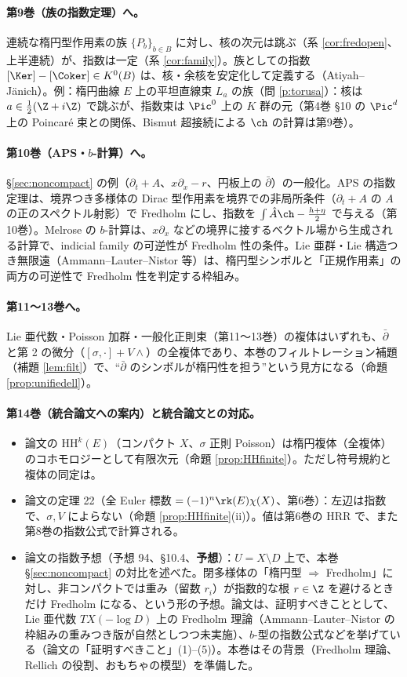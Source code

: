 \paragraph{第9巻（族の指数定理）へ。}連続な楕円型作用素の族 $\{P_b\}_{b\in B}$ に対し、核の次元は跳ぶ（系 \ref{cor:fredopen}、上半連続）が、指数は一定（系 \ref{cor:family}）。族としての指数 $[\Ker]-[\Coker]\in K^0(B)$ は、核・余核を安定化して定義する（Atiyah--Jänich）。例：楕円曲線 $E$ 上の平坦直線束 $L_a$ の族（問 \ref{p:torusa}）：核は $a\in\frac12(\Z+i\Z)$ で跳ぶが、指数束は $\Pic^0$ 上の $K$ 群の元（第4巻 \S10 の $\Pic^d$ 上の Poincaré 束との関係、Bismut 超接続による $\ch$ の計算は第9巻）。
\paragraph{第10巻（APS・$b$-計算）へ。}\S\ref{sec:noncompact} の例（$\partial_t+A$、$x\partial_x-r$、円板上の $\bar\partial$）の一般化。APS の指数定理は、境界つき多様体の Dirac 型作用素を境界での非局所条件（$\partial_t+A$ の $A$ の正のスペクトル射影）で Fredholm にし、指数を $\int\hat A\ch-\frac{h+\eta}2$ で与える（第10巻）。Melrose の $b$-計算は、$x\partial_x$ などの境界に接するベクトル場から生成される計算で、indicial family の可逆性が Fredholm 性の条件。Lie 亜群・Lie 構造つき無限遠（Ammann--Lauter--Nistor 等）は、楕円型シンボルと「正規作用素」の両方の可逆性で Fredholm 性を判定する枠組み。
\paragraph{第11〜13巻へ。}Lie 亜代数・Poisson 加群・一般化正則束（第11〜13巻）の複体はいずれも、$\bar\partial$ と第 2 の微分（$[\sigma,\cdot]+V\wedge$）の全複体であり、本巻のフィルトレーション補題（補題 \ref{lem:filt}）で、``$\bar\partial$ のシンボルが楕円性を担う''という見方になる（命題 \ref{prop:unifiedell}）。
\paragraph{第14巻（統合論文への案内）と統合論文との対応。}
\begin{itemize}
\item 論文の $\mathrm{HH}^k(E)$（コンパクト $X$、$\sigma$ 正則 Poisson）は楕円複体（全複体）のコホモロジーとして有限次元（命題 \ref{prop:HHfinite}）。ただし符号規約と複体の同定は\tQ。
\item 論文の定理 22（全 Euler 標数 $=(-1)^n\rk(E)\chi(X)$、第6巻）：左辺は指数で、$\sigma,V$ によらない（命題 \ref{prop:HHfinite}(ii)）。値は第6巻の HRR で、また第8巻の指数公式で計算される。
\item 論文の指数予想（予想 94、§10.4、\textbf{予想}）：$U=X\setminus D$ 上で、本巻 \S\ref{sec:noncompact} の対比を述べた。閉多様体の「楕円型 $\Rightarrow$ Fredholm」に対し、非コンパクトでは重み（留数 $r_i$）が指数的な根 $r\in\Z$ を避けるときだけ Fredholm になる、という形の予想。論文は、証明すべきこととして、Lie 亜代数 $TX(-\log D)$ 上の Fredholm 理論（Ammann--Lauter--Nistor の枠組みの重みつき版が自然としつつ未実施）、$b$-型の指数公式などを挙げている（論文の「証明すべきこと」(1)--(5)）。本巻はその背景（Fredholm 理論、Rellich の役割、おもちゃの模型）を準備した。
\end{itemize}

